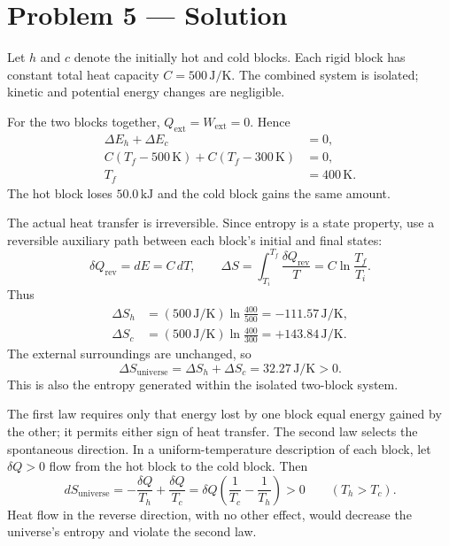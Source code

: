 \section*{Problem 5 --- Solution}

Let $h$ and $c$ denote the initially hot and cold blocks. Each rigid block has
constant total heat capacity $C=500\,\mathrm{J/K}$. The combined system is
isolated; kinetic and potential energy changes are negligible.

For the two blocks together, $Q_{\mathrm{ext}}=W_{\mathrm{ext}}=0$. Hence
\begin{align*}
\Delta E_h+\Delta E_c&=0,\\
C(T_f-500\,\mathrm{K})+C(T_f-300\,\mathrm{K})&=0,\\
T_f&=\boxed{400\,\mathrm{K}}.
\end{align*}
The hot block loses $50.0\,\mathrm{kJ}$ and the cold block gains the same amount.

The actual heat transfer is irreversible. Since entropy is a state property,
use a reversible auxiliary path between each block's initial and final states:
\[
\delta Q_{\mathrm{rev}}=dE=C\,dT,
\qquad
\Delta S=\int_{T_i}^{T_f}\frac{\delta Q_{\mathrm{rev}}}{T}
=C\ln\frac{T_f}{T_i}.
\]
Thus
\begin{align*}
\Delta S_h&=(500\,\mathrm{J/K})\ln\frac{400}{500}
=\boxed{-111.57\,\mathrm{J/K}},\\
\Delta S_c&=(500\,\mathrm{J/K})\ln\frac{400}{300}
=\boxed{+143.84\,\mathrm{J/K}}.
\end{align*}
The external surroundings are unchanged, so
\[
\boxed{\Delta S_{\mathrm{universe}}
=\Delta S_h+\Delta S_c
=32.27\,\mathrm{J/K}>0.}
\]
This is also the entropy generated within the isolated two-block system.

The first law requires only that energy lost by one block equal energy gained
by the other; it permits either sign of heat transfer. The second law selects
the spontaneous direction. In a uniform-temperature description of each block,
let $\delta Q>0$ flow from the hot block to the cold block. Then
\[
dS_{\mathrm{universe}}
=-\frac{\delta Q}{T_h}+\frac{\delta Q}{T_c}
=\delta Q\left(\frac{1}{T_c}-\frac{1}{T_h}\right)>0
\qquad (T_h>T_c).
\]
Heat flow in the reverse direction, with no other effect, would decrease the
universe's entropy and violate the second law.
